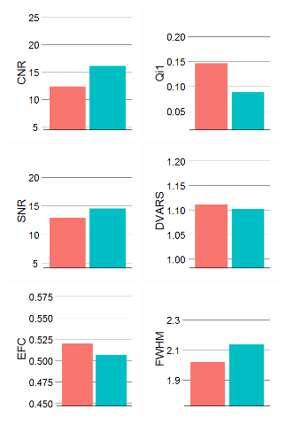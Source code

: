 \documentclass{frontiersSCNS} %
\begin{document}
\begin{figure}[!ht]
  \centering
    \includegraphics[width=4cm]{fig4_ratings_anat_CNR}
    \includegraphics[width=4cm]{fig4_ratings_anat_Qi1}
    \includegraphics[width=4cm]{fig4_ratings_anat_SNR}
    \includegraphics[width=4cm]{fig4_ratings_func_DVARS}
    \includegraphics[width=4cm]{fig4_ratings_func_EFC}
    \includegraphics[width=4cm]{fig4_ratings_func_FWHM}

\end{figure}
\end{document}
